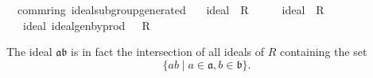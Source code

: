 \documentclass[12pt]{scrartcl}
\begin{document}
\begin{isabelle}
\isamarkupfalse%
\ {\isacharparenleft}{\kern0pt}\ comm{\isacharunderscore}{\kern0pt}ring{\isacharparenright}{\kern0pt}\ ideal{\isacharunderscore}{\kern0pt}subgroup{\isacharunderscore}{\kern0pt}generated{\isacharcolon}{\kern0pt}\isanewline
\ \ \ {\isachardoublequoteopen}ideal\ {\isasymaa}\ R\ {\isacharparenleft}{\kern0pt}{\isacharplus}{\kern0pt}{\isacharparenright}{\kern0pt}\ {\isacharparenleft}{\kern0pt}{\isasymcdot}{\isacharparenright}{\kern0pt}\ {\isasymzero}\ {\isasymone}{\isachardoublequoteclose}\ \ {\isachardoublequoteopen}ideal\ {\isasymbb}\ R\ {\isacharparenleft}{\kern0pt}{\isacharplus}{\kern0pt}{\isacharparenright}{\kern0pt}\ {\isacharparenleft}{\kern0pt}{\isasymcdot}{\isacharparenright}{\kern0pt}\ {\isasymzero}\ {\isasymone}{\isachardoublequoteclose}\isanewline
\ \ \ {\isachardoublequoteopen}ideal\ {\isacharparenleft}{\kern0pt}ideal{\isacharunderscore}{\kern0pt}gen{\isacharunderscore}{\kern0pt}by{\isacharunderscore}{\kern0pt}prod\ {\isasymaa}\ {\isasymbb}{\isacharparenright}{\kern0pt}\ R\ {\isacharparenleft}{\kern0pt}{\isacharplus}{\kern0pt}{\isacharparenright}{\kern0pt}\ {\isacharparenleft}{\kern0pt}{\isasymcdot}{\isacharparenright}{\kern0pt}\ {\isasymzero}\ {\isasymone}{\isachardoublequoteclose}
\end{isabelle}

The ideal $\mathfrak{a} \mathfrak{b}$ is in fact the intersection of all ideals of $R$ containing the set
	\[
	\lbrace a b \mid a \in \mathfrak{a}, b \in \mathfrak{b} \rbrace .
	\]
	
\end{document}
